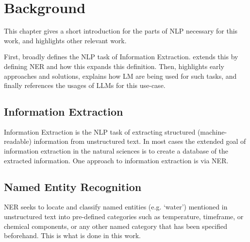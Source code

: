 \chapter{Background}\label{chap:background}

This chapter gives a short introduction for the parts of \acrlong{NLP} necessary for this work, and highlights other relevant work.

First,  broadly defines the \gls{NLP} task of Information Extraction.
 extends this by defining \gls{NER} and how this expands this definition.
Then,  highlights early approaches and solutions,  explains how \gls{LM} are being used for such tasks, and finally  references the usages of \glspl{LLM} for this use-case.




% 


\section{Information Extraction}\label{sec:extraction}
Information Extraction is the \gls{NLP} task of extracting structured (machine-readable) information from unstructured text.
In most cases the extended goal of information extraction in the natural sciences is to create a database of the extracted information.
One approach to information extraction is via \gls{NER}.

\section{Named Entity Recognition}\label{sec:NER}
\gls{NER} seeks to locate and classify named entities (e.g. `water') mentioned in unstructured text into pre-defined categories \cite{li_survey_2022} such as temperature, timeframe, or chemical components, or any other named category that has been specified beforehand.
This is what is done in this work.

